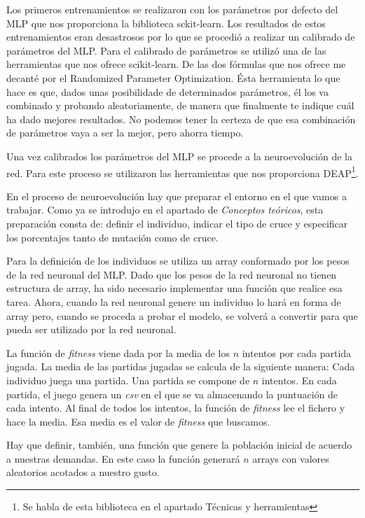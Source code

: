 Los primeros entrenamientos se realizaron con los parámetros por defecto del MLP que nos proporciona la biblioteca sckit-learn. Los resultados de estos entrenamientos eran desastrosos por lo que se procedió a realizar un calibrado de parámetros del MLP. Para el calibrado de parámetros se utilizó una de las herramientas que nos ofrece scikit-learn. De las dos fórmulas que nos ofrece me decanté por el Randomized Parameter Optimization. Ésta herramienta lo que hace es que, dados unas posibilidade de determinados parámetros, él los va combinado y probando aleatoriamente, de manera que finalmente te indique cuál ha dado mejores resultados. No podemos tener la certeza de que esa combinación de parámetros vaya a ser la mejor, pero ahorra tiempo.

Una vez calibrados los parámetros del MLP se procede a la neuroevolución de la red. Para este proceso se utilizaron las herramientas que nos proporciona DEAP\footnote{Se habla de esta biblioteca en el apartado Técnicas y herramientas}. 


En el proceso de neuroevolución hay que preparar el entorno en el que vamos a trabajar. Como ya se introdujo en el apartado de \emph{Conceptos teóricos}, esta preparación consta de: definir el individuo, indicar el tipo de cruce y especificar los porcentajes tanto de mutación como de cruce.

Para la definición de los individuos se utiliza un array conformado por los pesos de la red neuronal del MLP. Dado que los pesos de la red neuronal no tienen estructura de array, ha sido necesario implementar una función que realice esa tarea. Ahora, cuando la red neuronal genere un individuo lo hará en forma de array pero, cuando se proceda a probar el modelo, se volverá a convertir para que pueda ser utilizado por la red neuronal.

La función de \emph{fitness} viene dada por la media de los $n$ intentos por cada partida jugada. La media de las partidas jugadas se calcula de la siguiente manera: Cada individuo juega una partida. Una partida se compone de $n$ intentos. En cada partida, el juego genera un \emph{csv} en el que se va almacenando la puntuación de cada intento. Al final de todos los intentos, la función de \emph{fitness} lee el fichero y hace la media. Esa media es el valor de \emph{fitness} que buscamos.


Hay que definir, también, una función que genere la población inicial de acuerdo a nuestras demandas. En este caso la función generará $n$ arrays con valores aleatorios acotados a nuestro gusto.


